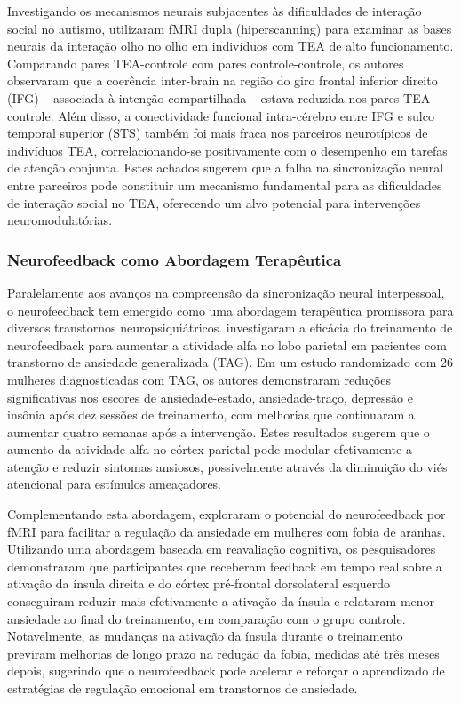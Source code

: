 Investigando os mecanismos neurais subjacentes às dificuldades de interação social no autismo,  utilizaram fMRI dupla (hiperscanning) para examinar as bases neurais da interação olho no olho em indivíduos com TEA de alto funcionamento. Comparando pares TEA-controle com pares controle-controle, os autores observaram que a coerência inter-brain na região do giro frontal inferior direito (IFG) – associada à intenção compartilhada – estava reduzida nos pares TEA-controle. Além disso, a conectividade funcional intra-cérebro entre IFG e sulco temporal superior (STS) também foi mais fraca nos parceiros neurotípicos de indivíduos TEA, correlacionando-se positivamente com o desempenho em tarefas de atenção conjunta. Estes achados sugerem que a falha na sincronização neural entre parceiros pode constituir um mecanismo fundamental para as dificuldades de interação social no TEA, oferecendo um alvo potencial para intervenções neuromodulatórias.

\subsubsection{Neurofeedback como Abordagem Terapêutica}
Paralelamente aos avanços na compreensão da sincronização neural interpessoal, o neurofeedback tem emergido como uma abordagem terapêutica promissora para diversos transtornos neuropsiquiátricos.  investigaram a eficácia do treinamento de neurofeedback para aumentar a atividade alfa no lobo parietal em pacientes com transtorno de ansiedade generalizada (TAG). Em um estudo randomizado com 26 mulheres diagnosticadas com TAG, os autores demonstraram reduções significativas nos escores de ansiedade-estado, ansiedade-traço, depressão e insônia após dez sessões de treinamento, com melhorias que continuaram a aumentar quatro semanas após a intervenção. Estes resultados sugerem que o aumento da atividade alfa no córtex parietal pode modular efetivamente a atenção e reduzir sintomas ansiosos, possivelmente através da diminuição do viés atencional para estímulos ameaçadores.

Complementando esta abordagem,  exploraram o potencial do neurofeedback por fMRI para facilitar a regulação da ansiedade em mulheres com fobia de aranhas. Utilizando uma abordagem baseada em reavaliação cognitiva, os pesquisadores demonstraram que participantes que receberam feedback em tempo real sobre a ativação da ínsula direita e do córtex pré-frontal dorsolateral esquerdo conseguiram reduzir mais efetivamente a ativação da ínsula e relataram menor ansiedade ao final do treinamento, em comparação com o grupo controle. Notavelmente, as mudanças na ativação da ínsula durante o treinamento previram melhorias de longo prazo na redução da fobia, medidas até três meses depois, sugerindo que o neurofeedback pode acelerar e reforçar o aprendizado de estratégias de regulação emocional em transtornos de ansiedade.

